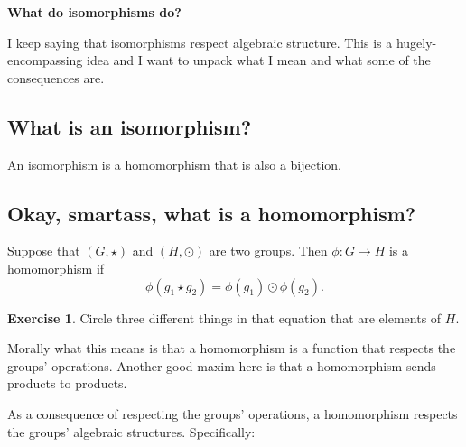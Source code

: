 \documentclass[12pt]{article}
\theoremstyle{definition} %
\newtheorem*{exercise}{Exercise}
\newcommand{\Alert}[1]{\textcolor{xRed}{#1}}
\newcommand{\Galert}[1]{\textcolor{xGreen}{#1}}
\renewcommand{\section}[1]{\begin{center} \large\textbf{#1} \\\end{center}}
\begin{document}
\section{What do isomorphisms do?}

I keep saying that \Alert{isomorphisms respect algebraic structure}. This is a hugely-encompassing idea and I want to unpack what I mean and what some of the consequences are.

\subsection*{What is an isomorphism?}

An isomorphism is a homomorphism that is also a bijection.

\subsection*{Okay, smartass, what is a homomorphism?}

Suppose that $(G, \star)$ and $(H, \odot)$ are two groups. Then $\phi:G \to H$ is a homomorphism if \[\phi(g_1 \star g_2) = \phi(g_1) \odot \phi(g_2).\] 

\begin{exercise}
    Circle three different things in that equation that are elements of $H$.
\end{exercise}

Morally what this means is that \Alert{a homomorphism is a function that respects the groups' operations.} Another good maxim here is that \Galert{a homomorphism sends products to products.} 

As a consequence of respecting the groups' \Alert{operations}, a homomorphism respects the groups' \Alert{algebraic structures}. Specifically:
\end{document}
